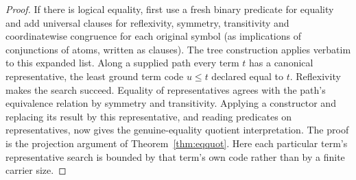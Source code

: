 \begin{proof}
If there is logical equality, first use a fresh binary predicate for equality and add universal clauses for reflexivity, symmetry, transitivity and coordinatewise congruence for each original symbol (as implications of conjunctions of atoms, written as clauses). The tree construction applies verbatim to this expanded list. Along a supplied path every term $t$ has a canonical representative, the least ground term code $u\le t$ declared equal to $t$. Reflexivity makes the search succeed. Equality of representatives agrees with the path's equivalence relation by symmetry and transitivity. Applying a constructor and replacing its result by this representative, and reading predicates on representatives, now gives the genuine-equality quotient interpretation. The proof is the projection argument of Theorem~\ref{thm:eqquot}. Here each particular term's representative search is bounded by that term's own code rather than by a finite carrier size.
\end{proof}
